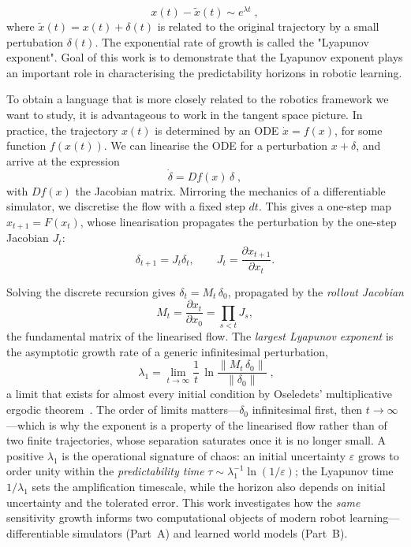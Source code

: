 \documentclass[11pt]{article}
\begin{document}
\begin{equation}
 x(t) - \tilde{x}(t) \sim e^{\lambda t}\;,
\end{equation}
where $\tilde x(t)=x(t)+\delta(t)$ is related to the original trajectory by a small pertubation $\delta(t)$.
The exponential rate of growth is called the "Lyapunov exponent". Goal of this work is to demonstrate that the Lyapunov exponent plays an important role in characterising the predictability horizons in robotic learning. 


To obtain a language that is more closely related to the robotics framework we want to study, it is advantageous to work in the tangent space picture. In practice, the trajectory $x(t)$ is determined by an ODE $\dot{x}=f(x)$, for some function $f(x(t))$. We can linearise the ODE for a perturbation $x+\delta$, and arrive at the expression
\begin{equation}
\dot{\delta}= D\!f(x)\,\delta\;, 
\end{equation}
with $D\!f(x)$ the Jacobian matrix.
Mirroring the mechanics of a differentiable simulator, we discretise the flow with a fixed step $dt$. This gives a one-step map $x_{t+1}=F(x_t)$, whose linearisation propagates the perturbation by the one-step Jacobian $J_t$:
\begin{equation}
\delta_{t+1} = J_t \delta_t, \qquad J_t = \frac{\partial x_{t+1}}{\partial x_t}.
\end{equation}

Solving the discrete recursion gives $\delta_t = M_t\,\delta_0$, propagated by the \emph{rollout Jacobian}
\begin{equation}
M_t = \frac{\partial x_t}{\partial x_0} = \prod_{s<t} J_s ,
\label{eq:rollout-jacobian}
\end{equation}
the fundamental matrix of the linearised flow. The \emph{largest Lyapunov exponent} is the asymptotic growth rate of a generic infinitesimal perturbation,
\begin{equation}
\boxed{\;\lambda_1 = \lim_{t\to\infty}\frac{1}{t}\,\ln\frac{\lVert M_t\,\delta_0\rVert}{\lVert\delta_0\rVert}\;},
\label{eq:lambda1}
\end{equation}
a limit that exists for almost every initial condition by Oseledets' multiplicative ergodic theorem~\cite{oseledets1968multiplicative}. The order of limits matters---$\delta_0$ infinitesimal first, then $t\to\infty$---which is why the exponent is a property of the linearised flow rather than of two finite trajectories, whose separation saturates once it is no longer small. A positive $\lambda_1$ is the operational signature of chaos: an initial uncertainty $\varepsilon$ grows to order unity within the \emph{predictability time} $\tau \sim \lambda_1^{-1}\ln(1/\varepsilon)$; the Lyapunov time $1/\lambda_1$ sets the amplification timescale, while the horizon also depends on initial uncertainty and the tolerated error. This work investigates how the \emph{same} sensitivity growth informs two computational objects of modern robot learning---differentiable simulators (Part~A) and learned world models (Part~B).
\end{document}
